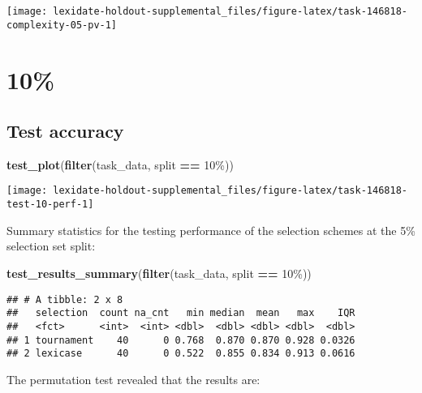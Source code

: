\documentclass[
]{book}
\newenvironment{Shaded}{\begin{snugshade}}{\end{snugshade}}
\newcommand{\FunctionTok}[1]{\textcolor[rgb]{0.13,0.29,0.53}{\textbf{#1}}}
\newcommand{\NormalTok}[1]{#1}
\newcommand{\SpecialCharTok}[1]{\textcolor[rgb]{0.81,0.36,0.00}{\textbf{#1}}}
\newcommand{\StringTok}[1]{\textcolor[rgb]{0.31,0.60,0.02}{#1}}
\begin{document}
\texttt{[image: lexidate-holdout-supplemental\_files/figure-latex/task-146818-complexity-05-pv-1]}

\hypertarget{section-1}{%
\section{10\%}\label{section-1}}

\hypertarget{test-accuracy-1}{%
\subsection{Test accuracy}\label{test-accuracy-1}}

\begin{Shaded}
\begin{Highlighting}[]
\FunctionTok{test\_plot}\NormalTok{(}\FunctionTok{filter}\NormalTok{(task\_data, split }\SpecialCharTok{==} \StringTok{\textquotesingle{}10\%\textquotesingle{}}\NormalTok{))}
\end{Highlighting}
\end{Shaded}

\texttt{[image: lexidate-holdout-supplemental\_files/figure-latex/task-146818-test-10-perf-1]}

Summary statistics for the testing performance of the selection schemes at the 5\% selection set split:

\begin{Shaded}
\begin{Highlighting}[]
\FunctionTok{test\_results\_summary}\NormalTok{(}\FunctionTok{filter}\NormalTok{(task\_data, split }\SpecialCharTok{==} \StringTok{\textquotesingle{}10\%\textquotesingle{}}\NormalTok{))}
\end{Highlighting}
\end{Shaded}

\begin{verbatim}
## # A tibble: 2 x 8
##   selection  count na_cnt   min median  mean   max    IQR
##   <fct>      <int>  <int> <dbl>  <dbl> <dbl> <dbl>  <dbl>
## 1 tournament    40      0 0.768  0.870 0.870 0.928 0.0326
## 2 lexicase      40      0 0.522  0.855 0.834 0.913 0.0616
\end{verbatim}

The permutation test revealed that the results are:
\end{document}
